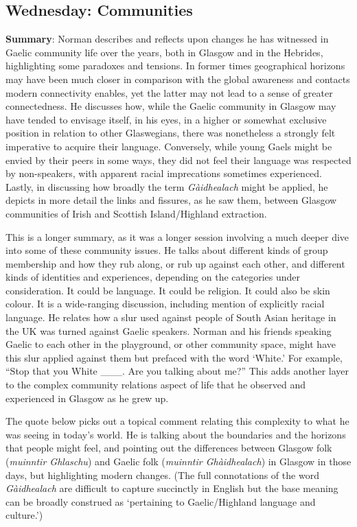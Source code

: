 \documentclass[output=paper,colorlinks,citecolor=brown]{langscibook}
\begin{document}
\subsection{Wednesday: Communities}

\textbf{Summary}: Norman describes and reflects upon changes he has witnessed in Gaelic community life over the years, both in Glasgow and in the Hebrides, highlighting some paradoxes and tensions. In former times geographical horizons may have been much closer in comparison with the global awareness and contacts modern connectivity enables, yet the latter may not lead to a sense of greater connectedness. He discusses how, while the Gaelic community in Glasgow may have tended to envisage itself, in his eyes, in a higher or somewhat exclusive position in relation to other Glaswegians, there was nonetheless a strongly felt imperative to acquire their language. Conversely, while young Gaels might be envied by their peers in some ways, they did not feel their language was respected by non-speakers, with apparent racial imprecations sometimes experienced. Lastly, in discussing how broadly the term \textit{Gàidhealach} might be applied, he depicts in more detail the links and fissures, as he saw them, between Glasgow communities of Irish and Scottish Island/Highland extraction.

This is a longer summary, as it was a longer session involving a much deeper dive into some of these community issues. He talks about different kinds of group membership and how they rub along, or rub up against each other, and different kinds of identities and experiences, depending on the categories under consideration. It could be language. It could be religion. It could also be skin colour. It is a wide-ranging discussion, including mention of explicitly racial language. He relates how a slur used against people of South Asian heritage in the UK was turned against Gaelic speakers. Norman and his friends speaking Gaelic to each other in the playground, or other community space, might have this slur applied against them but prefaced with the word `White.' For example, ``Stop that you White \_\_\_. Are you talking about me?” This adds another layer to the complex community relations aspect of life that he observed and experienced in Glasgow as he grew up.

The quote below picks out a topical comment relating this complexity to what he was seeing in today’s world. He is talking about the boundaries and the horizons that people might feel, and pointing out the differences between Glasgow folk (\textit{muinntir Ghlaschu}) and Gaelic folk (\textit{muinntir Ghàidhealach}) in Glasgow in those days, but highlighting modern changes. (The full connotations of the word \textit{Gàidhealach} are difficult to capture succinctly in English but the base meaning can be broadly construed as ‘pertaining to Gaelic/Highland language and culture.’)
\end{document}
